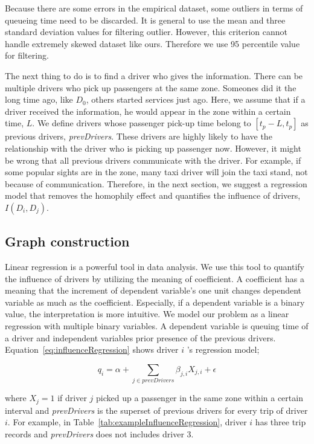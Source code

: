 \documentclass{article}
\begin{document}
Because there are some errors in the empirical dataset, some outliers in terms of queueing time need to be discarded. It is general to use the mean and three standard deviation values for filtering outlier. However, this criterion cannot handle extremely skewed dataset like ours. Therefore we use 95 percentile value for filtering. 

The next thing to do is to find a driver who gives the information. There can be multiple drivers who pick up passengers at the same zone. Someones did it the long time ago, like $D_0$, others started services just ago. Here, we assume that if a driver received the information, he would appear in the zone within a certain time, $L$. We define drivers whose passenger pick-up time belong to $[t_{p}-L,t_{p}]$ as previous drivers, \emph{prevDrivers}. These drivers are highly likely to have the relationship with the driver who is picking up passenger now. However, it might be wrong that all previous drivers communicate with the driver. For example, if some popular sights are in the zone, many taxi driver will join the taxi stand, not because of communication. Therefore, in the next section, we suggest a regression model that removes the homophily effect and quantifies the influence of drivers, $I(D_i,D_j)$.


\subsection{Graph construction} \label{sec:graphConstruction}

Linear regression is a powerful tool in data analysis. We use this tool to quantify the influence of drivers by utilizing the meaning of coefficient. A coefficient has a meaning that the increment of dependent variable's one unit changes dependent variable as much as the coefficient. Especially, if a dependent variable is a binary value, the interpretation is more intuitive. We model our problem as a linear regression with multiple binary variables. A dependent variable is queuing time of a driver and independent variables prior presence of the previous drivers. Equation~\ref{eq:influenceRegression} shows driver $i$ 's regression model;

\begin{equation} \label{eq:influenceRegression}
    q_{i}=\alpha + \sum_{j \in prevDrivers} \beta_{j,i}X_{j,i} + \epsilon
\end{equation}

\noindent where $X_{j}=1$ if driver $j$ picked up a passenger in the same zone within a certain interval and \emph{prevDrivers} is the superset of previous drivers for every trip of driver $i$. For example, in Table~\ref{tab:exampleInfluenceRegression}, driver $i$ has three trip records and \emph{prevDrivers} does not includes driver 3.
\end{document}
